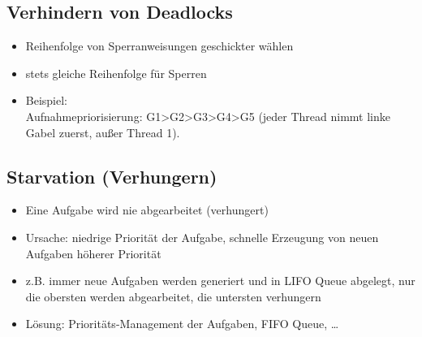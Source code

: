 \subsection{Verhindern von Deadlocks}
\begin{itemize}
\item Reihenfolge von Sperranweisungen geschickter wählen
\item stets gleiche Reihenfolge für Sperren
\item Beispiel:\\
Aufnahmepriorisierung: G1>G2>G3>G4>G5 (jeder Thread nimmt linke Gabel zuerst, außer Thread 1).
\begin{center}
\end{center}
\end{itemize}

\subsection{Starvation (Verhungern)}
\begin{itemize}
\item Eine Aufgabe wird nie abgearbeitet (verhungert)
\item Ursache: niedrige Priorität der Aufgabe, schnelle Erzeugung von neuen Aufgaben höherer Priorität
\item z.B. immer neue Aufgaben werden generiert und in LIFO Queue abgelegt, nur die obersten werden abgearbeitet, die untersten verhungern
\item Lösung: Prioritäts-Management der Aufgaben, FIFO Queue, … 
\end{itemize}
